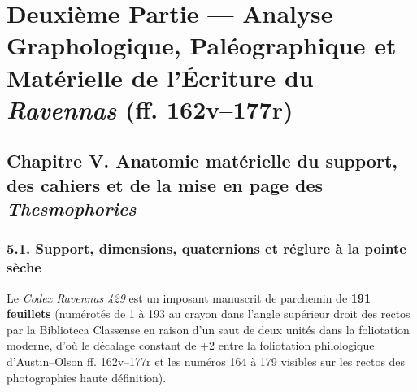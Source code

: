 \documentclass[11pt, a4paper, twoside]{article}
\renewcommand{\_}{\origunderscore\penalty0\relax}
\renewcommand{\texttt}[1]{#1}
\begin{document}
\section{Deuxième Partie — Analyse Graphologique, Paléographique et Matérielle de l'Écriture du \textit{Ravennas} (\texttt{ff. 162v–177r})}


\subsection{Chapitre V. Anatomie matérielle du support, des cahiers et de la mise en page des \textit{Thesmophories}}


\subsubsection{5.1. Support, dimensions, quaternions et réglure à la pointe sèche}

Le \textit{Codex Ravennas 429} est un imposant manuscrit de parchemin de \textbf{191 feuillets} (numérotés de \texttt{1} à \texttt{193} au crayon dans l'angle supérieur droit des rectos par la Biblioteca Classense en raison d'un saut de deux unités dans la foliotation moderne, d'où le décalage constant de +2 entre la foliotation philologique d'Austin–Olson \texttt{ff. 162v–177r} et les numéros \texttt{164} à \texttt{179} visibles sur les rectos des photographies haute définition).
\end{document}
